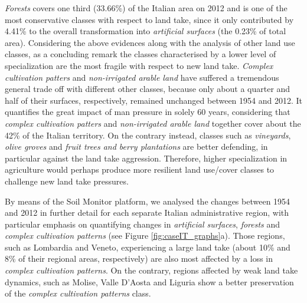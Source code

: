 \documentclass[APA,LATO1COL,doublespace]{WileyNJD-v2}
\newcommand{\toberevised}[1]{\emph{\textcolor{red}{#1}}} %
\begin{document}
\textit{Forests} covers one third (33.66\%) of the Italian area on 2012 and is one of the most conservative classes with respect to land take, since it only contributed by 4.41\% to the overall transformation into \textit{artificial surfaces} (the 0.23\% of total area).
Considering the above evidences along with the analysis of other land use classes, as a concluding remark the classes characterised by a lower level of specialization are the most fragile with respect to new land take.
\textit{Complex cultivation patters} and \textit{non-irrigated arable land} have suffered a tremendous general trade off with different other classes, because only about a quarter and half of their surfaces, respectively, remained unchanged between 1954 and 2012.
It quantifies the great impact of man pressure in solely 60 years, considering that \textit{complex cultivation patters} and \textit{non-irrigated arable land} together cover about the 42\% of the Italian territory.
On the contrary instead, classes such as \textit{vineyards}, \textit{olive groves} and \textit{fruit trees and berry plantations} are better defending, in particular against the land take aggression.
Therefore, higher specialization in agriculture would perhaps produce more resilient land use/cover classes to challenge new land take pressures.

By means of the Soil Monitor platform, we analysed the changes between 1954 and 2012 in further detail
for each separate Italian administrative region, with particular emphasis on quantifying changes in \textit{artificial surfaces}, \textit{forests} and \textit{complex cultivation patterns} (see Figure \ref{fig:caseIT_graphs}a).
Those regions, such as Lombardia and Veneto, experiencing a large land take (about 10\% and 8\% of their regional areas, respectively) are also most affected by a loss in \textit{complex cultivation patterns}.
On the contrary, regions affected by weak land take dynamics, such as Molise, Valle D'Aosta and Liguria show a better preservation of the \textit{complex cultivation patterns} class.%
\end{document}
